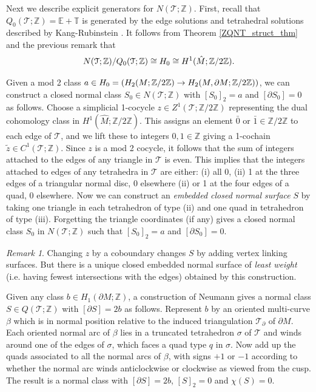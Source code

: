 \documentclass[12pt,reqno]{amsart}  %
\theoremstyle{definition}
\theoremstyle{remark}
\newtheorem{rmk}[thm]{Remark}
\newcommand{\TT}{\mathbb{T}}
\newcommand{\T}{\mathcal{T}}
\def\Z{\mathbb Z}
\def\bd{\partial}
\let\Im\relax
\DeclareMathOperator{\Im}{Im}
\def\TT{\mathbb T}   %
\def\EE{\mathbb E}   %
\begin{document}
Next we describe explicit generators for $N(\T;\Z)$. First, recall that 
$Q_0(\T;\Z) = \EE +\TT$ is generated by the edge solutions and tetrahedral 
solutions described by Kang-Rubinstein \cite{KR1}. 
It follows from Theorem \ref{ZQNT_struct_thm} and the previous  remark that 
$$
N(\T;\Z)/Q_0(\T;\Z) \cong \Im H_0 \cong H^1(\hat M; \Z/2\Z).
$$

Given a mod 2 class  
$a \in \Im H_0 = \Im ( H_2(M;\Z/2\Z) \to H_2(M,\bd M;\Z/2\Z))$, we can 
construct a closed normal class  $S_0\in N(\T;\Z)$ with $[S_0]_2=a$ and 
$[\bd S_0]=0$ as follows. 
Choose a simplicial 1-cocycle $z \in Z^1(\T;\Z/2\Z)$ representing the dual 
cohomology class in $H^1(\hat M;\Z/2\Z)$.
This assigns an element $\bar 0$ or $\bar 1 \in \Z/2\Z$ to each edge of 
$\T$, and we lift these to integers $0,1 \in \Z$ giving a 1-cochain 
$\tilde z \in C^1(\T;\Z)$.  
Since  $z$ is a mod 2 cocycle, it follows that the sum of integers 
attached to the edges of any triangle in $\T$ is even. This implies that 
the integers attached to edges of any tetrahedra in $\T$ are either:
(i) all 0, (ii) 1 at the three edges of a triangular normal disc, 0 
elsewhere (ii) or 1 at the four edges of a quad, 0 elsewhere. 
Now we can construct an {\em embedded closed normal surface} $S$ by 
taking one triangle in each tetrahedron of type (ii) 
and one quad in tetrahedron of type (iii).   Forgetting the triangle 
coordinates (if any) gives a closed normal class $S_0$ in $N(\T;\Z)$
such that $[S_0]_2=a$ and $[\bd S_0]=0$.

\begin{rmk} 
Changing $z$ by a coboundary changes $S$ by adding vertex linking surfaces. 
But there is a unique closed embedded normal surface of {\em least weight} 
(i.e. having fewest intersections with the edges) obtained by this 
construction.
\end{rmk}

\medskip Given any class $b \in H_1(\bd M;\Z)$, a construction of 
Neumann \cite{N} gives a normal class $S \in Q(\T;\Z)$
with $[\bd S] = 2 b$ as follows. Represent $b$ by an oriented multi-curve 
$\beta$ which is in normal position relative to the induced triangulation 
$\T_\bd$ of $\bd M$.  Each oriented normal arc of $\beta$ lies in a truncated 
tetrahedron $\sigma$ of $\T$ and winds around one of the edges of $\sigma$, 
which faces a quad type $q$ in $\sigma$. Now add up the quads associated 
to all the normal arcs of $\beta$, with signs $+1$ or $-1$ according to 
whether the normal arc winds anticlockwise or clockwise as viewed from the 
cusp. The result is a normal class with $[\bd S] = 2 b$, $[S]_2=0$ and 
$\chi(S)=0$. 
\end{document}
